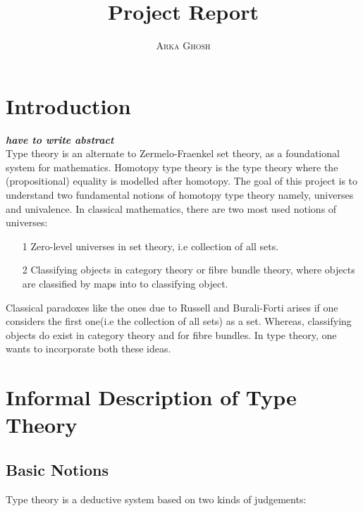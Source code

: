 \documentclass[10pt]{article}
\title{\bf{Project Report}}
\author{\textsc{Arka Ghosh}}
\theoremstyle{definition}
\theoremstyle{plain}
\theoremstyle{remark}
\begin{document}
\begin{titlepage}

\maketitle

\tableofcontents
\end{titlepage}

\section{Introduction}\label{Intro}
\textbf{\textit{have to write abstract}}\\
Type theory is an alternate to Zermelo-Fraenkel set theory, as a foundational system for mathematics. Homotopy type theory is the type theory where the (propositional) equality is modelled after homotopy. The goal of this project is to understand two fundamental notions of homotopy type theory namely, universes and univalence. In classical mathematics, there are two most used notions of universes:

\begin{enumerate}

\item[1] Zero-level universes in set theory, i.e collection of all sets.

\item[2] Classifying objects in category theory or fibre bundle theory, where objects are 
         classified by maps into to classifying object.  

\end{enumerate}

\noindent Classical paradoxes like the ones due to Russell and Burali-Forti arises if one 
considers the first one(i.e the collection of all sets) as a set. Whereas, classifying objects 
do exist in category theory and for fibre bundles. In type theory, one wants to incorporate 
both these ideas. 

\section{Informal Description of Type Theory}

\subsection{Basic Notions}
Type theory is a deductive system based on two kinds of judgements:
\end{document}
